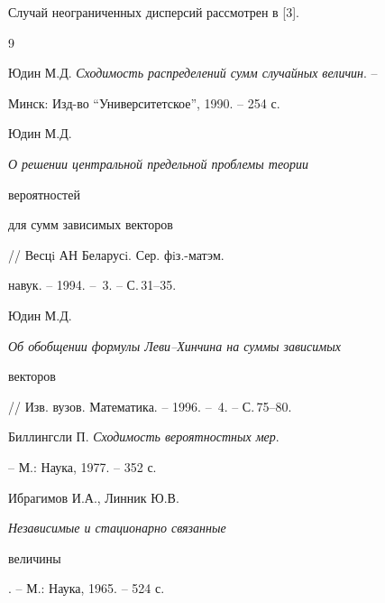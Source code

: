  


Случай неограниченных дисперсий рассмотрен в [3]. 


 


\begin{thebibliography}{9} 


 




Юдин М.Д. {\em Сходимость распределений сумм случайных величин}. -- 


Минск: Изд-во ``Университетское'', 1990. -- 254 с. 




Юдин М.Д. {\em О решении центральной предельной проблемы теории 


вероятностей 


для сумм зависимых векторов} // Весцi АН Беларусi. Сер. фiз.-матэм. 


навук. -- 1994. -- \No\,3. -- С.\,31--35. 




Юдин М.Д. {\em Об обобщении формулы Леви--Хинчина на суммы зависимых 


векторов} // Изв. вузов. Математика. -- 1996. -- \No\,4. -- С.\,75--80. 




Биллингсли П. {\em Сходимость вероятностных мер}. 


-- М.: Наука, 1977. -- 352 с. 




Ибрагимов И.А., Линник Ю.В. {\em Независимые и стационарно связанные 


величины}. -- М.: Наука, 1965. -- 524 с. 


 


\end{thebibliography} 


 


\vskip 2cm 


 






 


\label{end} 


 



